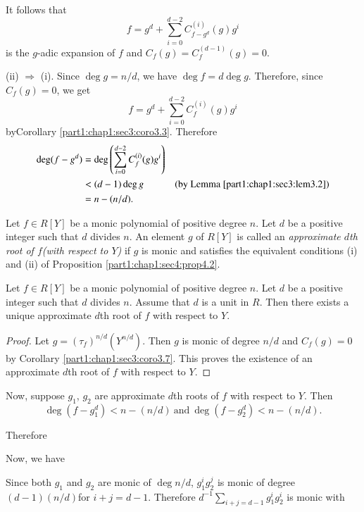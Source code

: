 It follows that
$$
f = g^d + \sum^{d-2}_{i=0} C^{(i)}_{f- g^d} (g) g^i
$$
is the $g$-adic expansion of $f$ and $C_f(g) = C_f^{(d-1)} (g) =0$.

(ii) $\Rightarrow$ (i). Since $\deg g = n/d$, we have $\deg f = d \deg g$. Therefore, since $C_f (g)=0$, we get
$$
f= g^d + \sum^{d-2}_{i=0} C_f^{(i)} (g) g^i
$$
by\pageoriginale Corollary \ref{part1:chap1:sec3:coro3.3}. Therefore
\begin{align*}
  \deg (f- g^d) & = \deg \left( \sum^{d-2}_{i=0} C_f ^{(i)} (g) g^i\right) &\\
  & < (d-1) \deg g & (\text{by Lemma \ref{part1:chap1:sec3:lem3.2}})\\
  & = n- (n/d).
\end{align*}

\begin{defi}\label{part1:chap1:sec4:def4.3}
  Let $f \in R[Y]$ be a monic polynomial of positive degree $n$. Let $d$ be a positive integer such that $d$ divides $n$. An element $g$ of $R[Y]$ is called an {\em approximate $d$th root of $f$(with respect to $Y$)} if $g$ is monic and satisfies the equivalent conditions (i) and (ii) of Proposition \ref{part1:chap1:sec4:prop4.2}.
\end{defi}

\begin{thm}\label{part1:chap1:sec4:thm4.4}
  Let $f \in R [Y]$ be a monic polynomial of positive degree $n$. Let $d$ be a positive integer such that $d$ divides $n$. Assume that $d$ is a unit in $R$. Then there exists a unique approximate $d$th root of $f$ with respect to $Y$.
\end{thm}

\begin{proof}
  Let $g= (\tau_f)^{n/d}(Y^{n/d})$. Then $g$ is monic of degree $n/d$ and $C_f (g)=0$ by Corollary \ref{part1:chap1:sec3:coro3.7}. This proves the existence of an approximate $d$th root of $f$ with respect to $Y$.
\end{proof}

Now, suppose $g_1$, $g_2$ are approximate $d$th roots of $f$ with respect to $Y$. Then
$$
\deg (f- g_1^d) < n- (n/d) ~\text{and}~ \deg (f- g_2^d) < n- (n/d).
$$

Therefore

Now, we have

Since both $g_1$ and $g_2$ are monic of $\deg n/d$, $g_1^i g^j_2$ is monic of degree $(d-1)(n/d)$\pageoriginale for $i+j=d-1$. Therefore $d^{-1} \sum_{i + j= d-1} g_1^i g_2^i$ is monic with 

